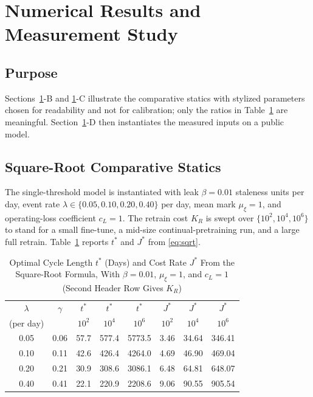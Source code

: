 \documentclass[journal]{IEEEtran}
\begin{document}
\section{Numerical Results and Measurement Study}\label{sec:num}
\subsection{Purpose}
Sections~\ref{sec:num}-B and \ref{sec:num}-C illustrate the comparative statics with stylized parameters chosen for readability and not for calibration; only the ratios in Table~\ref{tab:sqrt} are meaningful. Section~\ref{sec:num}-D then instantiates the measured inputs on a public model.

\subsection{Square-Root Comparative Statics}
The single-threshold model is instantiated with leak $\beta=0.01$ staleness units per day, event rate $\lambda\in\{0.05,0.10,0.20,0.40\}$ per day, mean mark $\mu_\xi=1$, and operating-loss coefficient $c_L=1$. The retrain cost $K_R$ is swept over $\{10^2,10^4,10^6\}$ to stand for a small fine-tune, a mid-size continual-pretraining run, and a large full retrain. Table~\ref{tab:sqrt} reports $t^\ast$ and $J^\ast$ from \eqref{eq:sqrt}.

\begin{table}[t]
\caption{Optimal Cycle Length $t^\ast$ (Days) and Cost Rate $J^\ast$ From the Square-Root Formula, With $\beta=0.01$, $\mu_\xi=1$, and $c_L=1$ (Second Header Row Gives $K_R$)}\label{tab:sqrt}
\centering
\footnotesize
\begin{tabular}{cccccccc}
\toprule
$\lambda$ & $\gamma$ & $t^\ast$ & $t^\ast$ & $t^\ast$ & $J^\ast$ & $J^\ast$ & $J^\ast$\\
(per day) & & $10^2$ & $10^4$ & $10^6$ & $10^2$ & $10^4$ & $10^6$\\
\midrule
0.05 & 0.06 & 57.7 & 577.4 & 5773.5 & 3.46 & 34.64 & 346.41\\
0.10 & 0.11 & 42.6 & 426.4 & 4264.0 & 4.69 & 46.90 & 469.04\\
0.20 & 0.21 & 30.9 & 308.6 & 3086.1 & 6.48 & 64.81 & 648.07\\
0.40 & 0.41 & 22.1 & 220.9 & 2208.6 & 9.06 & 90.55 & 905.54\\
\bottomrule
\end{tabular}
\end{table}
\end{document}
